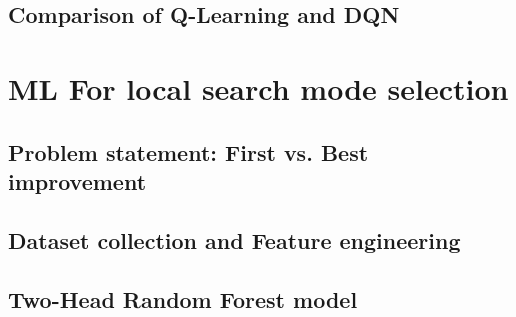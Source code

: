 \documentclass[preprint,12pt]{elsarticle}
\begin{document}
\subsection{Comparison of Q-Learning and DQN}

\section{ML For local search mode selection}
\label{sec:ml_fibi}

\subsection{Problem statement: First vs. Best improvement}

\subsection{Dataset collection and Feature engineering}


\subsection{Two-Head Random Forest model}
\end{document}

